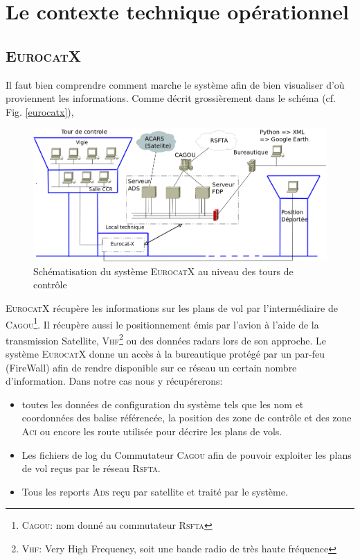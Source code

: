 



\section{Le contexte technique opérationnel}

    \subsection{\textsc{EurocatX}}
Il faut bien comprendre comment marche le système afin de bien visualiser d'où proviennent les informations. Comme décrit grossièrement dans le schéma (cf. Fig. \vref{eurocatx}),
\begin{figure}
    \center
    \includegraphics[width=15cm]{images/SchemaControle.png}
    \caption{Schématisation du système \textsc{EurocatX} au niveau des tours de contrôle}
    \label{eurocatx}
\end{figure}
\textsc{EurocatX} récupère les informations sur les plans de vol par l'intermédiaire de \textsc{Cagou}\footnote{\textsc{Cagou}: nom donné au commutateur \textsc{Rsfta}}. Il récupère aussi le positionnement émis par l'avion à l'aide de la transmission Satellite, \textsc{Vhf}\footnote{\textsc{Vhf}: Very High Frequency, soit une bande radio de très haute fréquence} ou des données radars lors de son approche. Le système \textsc{EurocatX} donne un accès à la bureautique protégé par un par-feu (FireWall) afin de rendre disponible sur ce réseau un certain nombre d'information. Dans notre cas nous y récupérerons:
\begin{itemize}
    \item toutes les données de configuration du système tels que les nom et coordonnées des balise référencée, la position des zone de contrôle et des zone \textsc{Aci} ou encore les route utilisée pour décrire les plans de vols.
    \item Les fichiers de log du Commutateur \textsc{Cagou} afin de pouvoir exploiter les plans de vol reçus par le réseau \textsc{Rsfta}.
    \item Tous les reports \textsc{Ads} reçu par satellite et traité par le système.
\end{itemize}\medskip 
